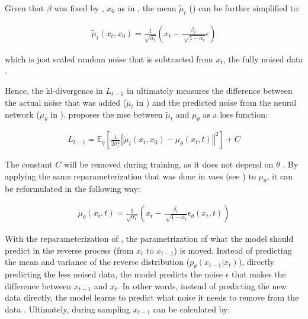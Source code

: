 \noindent Given that $\beta$ was fixed by \textcite{ho2020DenoisingDiffusionProbabilistic}, $x_0$ as in , the mean $\tilde{\mu}_t$ () can be further simplified to:

\begin{equation}
  \begin{align}
    \label{eqn:lt-1_3}
    \tilde{\mu}_t(x_t, x_0) = \frac{1}{\sqrt{\bar{\alpha}_t}}(x_t - \frac{\beta_t}{\sqrt[]{1-\bar{\alpha}_t}}\epsilon)
  \end{align}
\end{equation}

\noindent which is just scaled random noise that is subtracted from $x_t$, the fully noised data \cite{ho2020DenoisingDiffusionProbabilistic}.

Hence, the \gls{kl}-divergence in $L_{t-1}$ in  ultimately measures the difference between the actual noise that was added ($\tilde{\mu}_t$ in ) and the predicted noise from the neural network ($\mu_\theta$ in ).
\textcite{ho2020DenoisingDiffusionProbabilistic} proposes the \gls{mse} between $\tilde{\mu}_t$ and $\mu_\theta$ as a loss function:

\begin{equation}
  \begin{align}
    \label{eqn:mse_loss}
    L_{t-1} = \mathbb{E}_q \left[ \frac{1}{2\sigma_t^2} \left\Vert \tilde{\mu}_t(x_t, x_0) - \mu_\theta(x_t, t) \right\Vert^2 \right] + C
  \end{align}
\end{equation}

\noindent The constant $C$ will be removed during training, as it does not depend on $\theta$ \cite{ho2020DenoisingDiffusionProbabilistic}.
By applying the same reparameterization that was done in \glspl{vae} (see ) to $\mu_\theta$, it can be reformulated in the following way:

\begin{equation}
  \begin{align}
    \label{eqn:mse_loss_2}
    \mu_\theta(x_t,t)= \frac{1}{\sqrt{\alpha_t}}(x_t - \frac{\beta_t}{\sqrt[]{1-\bar{\alpha}_t}}\epsilon_\theta(x_t,t)) 
  \end{align}
\end{equation}

With the reparameterization of , the parametrization of what the \gls{model} should predict in the reverse process (from $x_t$ to $x_{t-1}$) is moved. 
Instead of predicting the mean and variance of the reverse distribution ($p_\theta(x_{t-1}|x_t)$), \ie directly predicting the less noised data, 
the \gls{model} predicts the noise $\epsilon$ that makes the difference between $x_{t-1}$ and ${x_t}$.
In other words, instead of predicting the new data directly, the \gls{model} learns to predict what noise it needs to remove from the data \cite{capel2022MasterThesisDenoising}.
Ultimately, during sampling $x_{t-1}$ can be calculated by:

